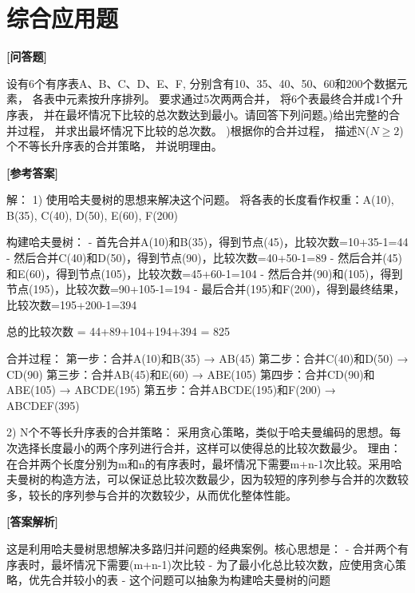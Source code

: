\documentclass[12pt,a4paper]{article}
\newenvironment{choicequestion}[1][]{%
    \vspace{0.5cm}
    \noindent\textbf{[#1]}
    \vspace{0.2cm}
}{}
\newenvironment{answersection}{%
    \vspace{0.2cm}
    \noindent\textbf{[参考答案]}\\
    \vspace{0.1cm}
}{}
\newenvironment{analysissection}{%
    \vspace{0.2cm}
    \noindent\textbf{[答案解析]}\\
    \vspace{0.1cm}
}{}
\newcounter{questioncounter}
\newcommand{\question}[2]{%
    \stepcounter{questioncounter}%
    \noindent\textbf{\thequestioncounter} #1%
}
\begin{document}
\section{综合应用题}

\begin{choicequestion}[问答题]
\question{设有6个有序表A、B、C、D、E、F, 分别含有10、35、40、50、60和200个数据元素， 各表中元素按升序排列。 要求通过5次两两合并， 将6个表最终合并成1个升序表， 并在最坏情况下比较的总次数达到最小。请回答下列问题。\newline
1)给出完整的合并过程， 并求出最坏情况下比较的总次数。  \newline
2)根据你的合并过程， 描述N($N \geq 2$)个不等长升序表的合并策略， 并说明理由。}{}

\begin{answersection}
解：
1) 使用哈夫曼树的思想来解决这个问题。
将各表的长度看作权重：A(10), B(35), C(40), D(50), E(60), F(200)

构建哈夫曼树：
- 首先合并A(10)和B(35)，得到节点(45)，比较次数=10+35-1=44
- 然后合并C(40)和D(50)，得到节点(90)，比较次数=40+50-1=89
- 然后合并(45)和E(60)，得到节点(105)，比较次数=45+60-1=104
- 然后合并(90)和(105)，得到节点(195)，比较次数=90+105-1=194
- 最后合并(195)和F(200)，得到最终结果，比较次数=195+200-1=394

总的比较次数 = 44+89+104+194+394 = 825

合并过程：
第一步：合并A(10)和B(35) → AB(45)
第二步：合并C(40)和D(50) → CD(90)
第三步：合并AB(45)和E(60) → ABE(105)
第四步：合并CD(90)和ABE(105) → ABCDE(195)
第五步：合并ABCDE(195)和F(200) → ABCDEF(395)

2) N个不等长升序表的合并策略：
采用贪心策略，类似于哈夫曼编码的思想。每次选择长度最小的两个序列进行合并，这样可以使得总的比较次数最少。
理由：在合并两个长度分别为m和n的有序表时，最坏情况下需要m+n-1次比较。采用哈夫曼树的构造方法，可以保证总比较次数最少，因为较短的序列参与合并的次数较多，较长的序列参与合并的次数较少，从而优化整体性能。
\end{answersection}

\begin{analysissection}
这是利用哈夫曼树思想解决多路归并问题的经典案例。核心思想是：
- 合并两个有序表时，最坏情况下需要(m+n-1)次比较
- 为了最小化总比较次数，应使用贪心策略，优先合并较小的表
- 这个问题可以抽象为构建哈夫曼树的问题
\end{analysissection}
\end{choicequestion}
\end{document}
